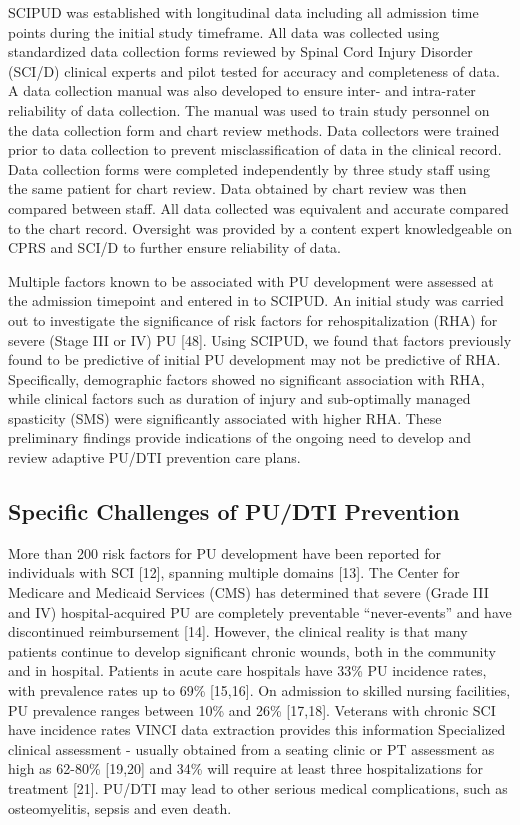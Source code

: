 \documentclass{amia}
\begin{document}
SCIPUD was established with longitudinal data including all admission time points during the initial study timeframe. All data was collected using standardized data collection forms reviewed by Spinal Cord Injury Disorder (SCI/D) clinical experts and pilot tested for accuracy and completeness of data. A data collection manual was also developed to ensure inter- and intra-rater reliability of data collection. The manual was used to train study personnel on the data collection form and chart review methods. Data collectors were trained prior to data collection to prevent misclassification of data in the clinical record. Data collection forms were completed independently by three study staff using the same patient for chart review. Data obtained by chart review was then compared between staff. All data collected was equivalent and accurate compared to the chart record. Oversight was provided by a content expert knowledgeable on CPRS and SCI/D to further ensure reliability of data.

Multiple factors known to be associated with PU development were assessed at the admission timepoint and entered in to SCIPUD. An initial study was carried out to investigate the significance of risk factors for rehospitalization (RHA) for severe (Stage III or IV) PU [48]. Using SCIPUD, we found that factors previously found to be predictive of initial PU development may not be predictive of RHA. Specifically, demographic factors showed no significant association with RHA, while clinical factors such as duration of injury and sub-optimally managed spasticity (SMS) were significantly associated with higher RHA. These preliminary findings provide indications of the ongoing need to develop and review adaptive PU/DTI prevention care plans.

\subsection{Specific Challenges of PU/DTI Prevention}

More than 200 risk factors for PU development have been reported for individuals with SCI [12], spanning multiple domains [13]. The Center for Medicare and Medicaid Services (CMS) has determined that severe (Grade III and IV) hospital-acquired PU are completely preventable ``never-events'' and have discontinued reimbursement [14]. However, the clinical reality is that many patients continue to develop significant chronic wounds, both in the community and in hospital. Patients in acute care hospitals have 33\% PU incidence rates, with prevalence rates up to 69\% [15,16]. On admission to skilled nursing facilities, PU prevalence ranges between 10\% and 26\% [17,18]. Veterans with chronic SCI have incidence rates VINCI data extraction provides this information Specialized clinical assessment - usually obtained from a seating clinic or PT assessment as high as 62-80\% [19,20] and 34\% will require at least three hospitalizations for treatment [21]. PU/DTI may lead to other serious medical complications, such as osteomyelitis, sepsis and even death.
\end{document}
